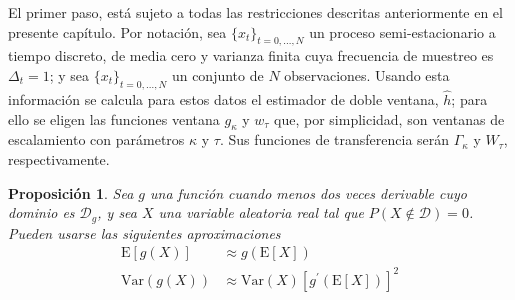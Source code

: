 \documentclass[12pt,letterpaper]{book}
\newtheorem{proposicion}[teorema]{Proposición}
\newcommand{\prima}{^{\prime}}
\newcommand{\E}[1]{\mathrm{E}\left[ #1 \right]}
\newcommand{\Var}[1]{\mathrm{Var}\left( #1 \right)}
\newcommand{\xtd}{$\{x_t\}_{t=0,\dots,N}$ }
\begin{document}
El primer paso, está sujeto a todas las restricciones descritas anteriormente en el presente capítulo.
%
Por notación, sea \xtd un proceso semi-estacionario a tiempo discreto, de media cero y varianza finita cuya frecuencia de muestreo es $\Delta_t=1$; y sea \xtd un conjunto de $N$ observaciones.
%
Usando esta información se calcula para estos datos el estimador de doble ventana, $\widehat{h}$; para ello se eligen las funciones ventana $g_\kappa$ y $w_\tau$ que, por simplicidad, son ventanas de escalamiento con parámetros $\kappa$ y $\tau$. 
%
Sus funciones de transferencia serán $\Gamma_\kappa$ y $W_\tau$, respectivamente.

\begin{proposicion}
Sea $g$ una función cuando menos dos veces derivable cuyo dominio es $\mathcal{D}_g$, y sea $X$ una variable aleatoria real tal que $P(X\notin \mathcal{D}) = 0$. 
%
Pueden usarse las siguientes aproximaciones
\begin{align}
\E{g(X)} &\approx g\left( \E{X} \right) \\
\Var{g(X)} &\approx \Var{X} \left[ g\prima \left( \E{X} \right) \right]^{2}
\end{align}
\end{proposicion}
\end{document}
